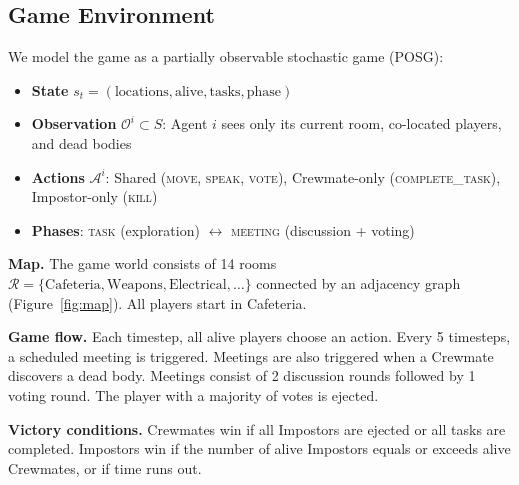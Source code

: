 \documentclass{article}
\begin{document}
\subsection{Game Environment}

We model the game as a partially observable stochastic game (POSG):
\begin{itemize}
    \item \textbf{State} $s_t = (\text{locations}, \text{alive}, \text{tasks}, \text{phase})$
    \item \textbf{Observation} $\mathcal{O}^i \subset S$: Agent $i$ sees only its current room, co-located players, and dead bodies
    \item \textbf{Actions} $\mathcal{A}^i$: Shared (\textsc{move, speak, vote}), Crewmate-only (\textsc{complete\_task}), Impostor-only (\textsc{kill})
    \item \textbf{Phases}: \textsc{task} (exploration) $\leftrightarrow$ \textsc{meeting} (discussion + voting)
\end{itemize}

\textbf{Map.} The game world consists of 14 rooms $\mathcal{R} = \{\text{Cafeteria}, \text{Weapons}, \text{Electrical}, \ldots\}$ connected by an adjacency graph (Figure~\ref{fig:map}). All players start in Cafeteria.

\textbf{Game flow.} Each timestep, all alive players choose an action. Every 5 timesteps, a scheduled meeting is triggered. Meetings are also triggered when a Crewmate discovers a dead body. Meetings consist of 2 discussion rounds followed by 1 voting round. The player with a majority of votes is ejected.

\textbf{Victory conditions.} Crewmates win if all Impostors are ejected or all tasks are completed. Impostors win if the number of alive Impostors equals or exceeds alive Crewmates, or if time runs out.
\end{document}

